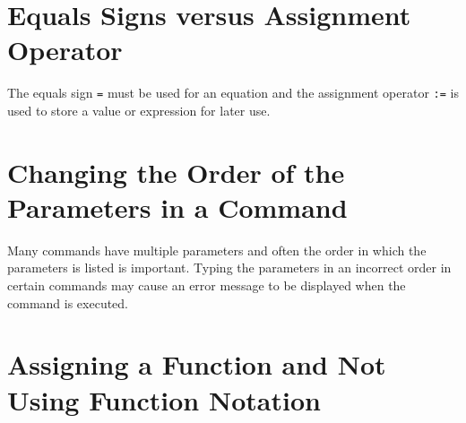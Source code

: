 \section*{Equals Signs versus Assignment Operator}

The equals sign \texttt{=} must be used for an equation and the assignment operator \texttt{:=} is used to store a value or expression for later use.

\begin{maplegroup}
\begin{mapleinput}
\end{mapleinput}
\mapleresult
\begin{maplelatex}
\end{maplelatex}
\end{maplegroup}

\section*{Changing the Order of the Parameters in a Command}

Many commands have multiple parameters and often the order in which the parameters is listed is important. Typing the parameters in an incorrect order in certain commands may cause an error message to be displayed when the command is executed.
\begin{maplegroup}
\begin{mapleinput}
\end{mapleinput}
\vspace{.3cm}
\mapleresult
\begin{maplelatex}

\end{maplelatex}
\end{maplegroup}

\section*{Assigning a Function and Not Using Function Notation}

